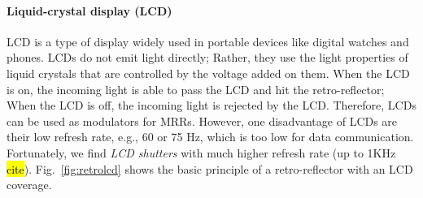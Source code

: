 
 
\paragraph{Liquid-crystal display (LCD)}
LCD is a type of display widely used in portable devices like digital watches and phones. LCDs do not emit light directly; Rather, they use the light properties of liquid crystals that are controlled by the voltage added on them. When the LCD is on, the incoming light is able to pass the LCD and hit the retro-reflector; When the LCD is off, the incoming light is rejected by the LCD. Therefore, LCDs can be used as modulators for MRRs. However, one disadvantage of LCDs are their low refresh rate, e.g., 60 or 75 Hz, which is too low for data communication. Fortunately, we find \textit{LCD shutters} with much higher refresh rate (up to 1KHz \hl{cite}). Fig.~\ref{fig:retrolcd} shows the basic principle of a retro-reflector with an LCD coverage.

